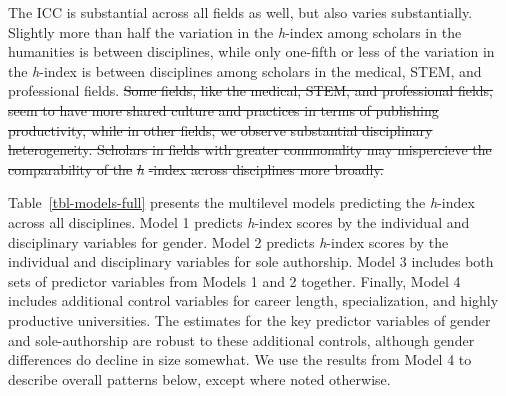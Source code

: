 \documentclass[
  10pt,
  letterpaper,
]{article}
\providecommand{\DIFdeltex}[1]{{\protect\color{red}\sout{#1}}}                      %
\providecommand{\DIFaddend}{} %
\providecommand{\DIFdelbegin}{} %
\providecommand{\DIFdelend}{} %
\providecommand{\DIFdel}[1]{\texorpdfstring{\DIFdeltex{#1}}{}} %
\newcommand{\DIFscaledelfig}{0.5}
\newlength{\DIFdelgraphicswidth} %
\newlength{\DIFdelgraphicsheight} %
\newcommand{\DIFdelincludegraphics}[2][]{%
\sbox{\DIFdelgraphicsbox}{\DIFOincludegraphics[#1]{#2}}%
\settoboxwidth{\DIFdelgraphicswidth}{\DIFdelgraphicsbox} %
\settoboxtotalheight{\DIFdelgraphicsheight}{\DIFdelgraphicsbox} %
\scalebox{\DIFscaledelfig}{%
\parbox[b]{\DIFdelgraphicswidth}{\usebox{\DIFdelgraphicsbox}\\[-\baselineskip] \rule{\DIFdelgraphicswidth}{0em}}\llap{\resizebox{\DIFdelgraphicswidth}{\DIFdelgraphicsheight}{%
\setlength{\unitlength}{\DIFdelgraphicswidth}%
\begin{picture}(1,1)%
\thicklines\linethickness{2pt} %
{\color[rgb]{1,0,0}\put(0,0){\framebox(1,1){}}}%
{\color[rgb]{1,0,0}\put(0,0){\line( 1,1){1}}}%
{\color[rgb]{1,0,0}\put(0,1){\line(1,-1){1}}}%
\end{picture}%
}\hspace*{3pt}}} %
} %
\DeclareRobustCommand{\DIFaddend}{\DIFOaddend \let\includegraphics\DIFOincludegraphics} %
\DeclareRobustCommand{\DIFdelbegin}{\DIFOdelbegin \let\includegraphics\DIFdelincludegraphics} %
\DeclareRobustCommand{\DIFdelend}{\DIFOaddend \let\includegraphics\DIFOincludegraphics} %
\begin{document}
\DIFaddend The ICC is substantial across all fields as well, but also varies
substantially. Slightly more than half the variation in the
\emph{h}-index among scholars in the humanities is between disciplines,
while only one-fifth or less of the variation in the \emph{h}-index is
between disciplines among scholars in the medical, STEM, and
professional fields.
\DIFdelbegin \DIFdel{Some fields, like the medical, STEM, and
professional fields, seem to have more shared culture and practices in
terms of publishing productivity, while in other fields, we observe
substantial disciplinary heterogeneity. Scholars in fields with greater
commonality may mispercieve the comparability of the }\emph{\DIFdel{h}}%
\DIFdel{-index
across disciplines more broadly.
}\DIFdelend 

Table~\ref{tbl-models-full} presents the multilevel models predicting
the \emph{h}-index across all disciplines. Model 1 predicts
\emph{h}-index scores by the individual and disciplinary variables for
gender. Model 2 predicts \emph{h}-index scores by the individual and
disciplinary variables for sole authorship. Model 3 includes both sets
of predictor variables from Models 1 and 2 together. Finally, Model 4
includes additional control variables for career length, specialization,
and highly productive universities. The estimates for the key predictor
variables of gender and sole-authorship are robust to these additional
controls, although gender differences do decline in size somewhat. We
use the results from Model 4 to describe overall patterns below, except
where noted otherwise.
\end{document}
